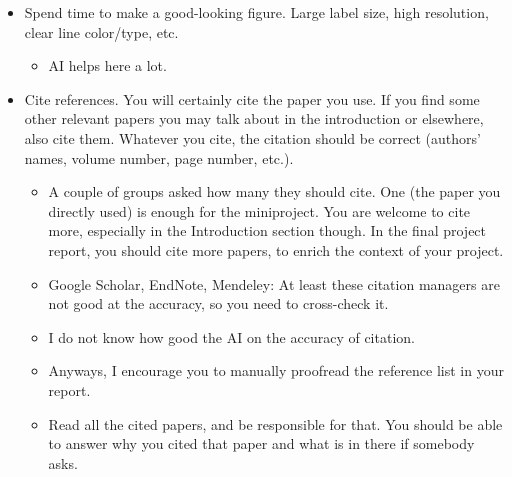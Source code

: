 \documentclass[20pt]{extarticle}
\begin{document}
\begin{enumerate}
\begin{itemize}
\begin{itemize}
		\end{itemize}
	\item Spend time to make a good-looking figure. Large label size, high resolution, clear line color/type, etc.
		\begin{itemize}
		\item AI helps here a lot.
		\end{itemize}
	\item Cite references. You will certainly cite the paper you use. If you find some other relevant papers you may talk about in the introduction or elsewhere, also cite them. Whatever you cite, the citation should be correct (authors' names, volume number, page number, etc.). 
		\begin{itemize}
		\item A couple of groups asked how many they should cite. One (the paper you directly used) is enough for the miniproject. You are welcome to cite more, especially in the Introduction section though. In the final project report, you should cite more papers, to enrich the context of your project.
		\item Google Scholar, EndNote, Mendeley: At least these citation managers are not good at the accuracy, so you need to cross-check it.
		\item I do not know how good the AI on the accuracy of citation.
		\item Anyways, I encourage you to manually proofread the reference list in your report.
		\item Read all the cited papers, and be responsible for that. You should be able to answer why you cited that paper and what is in there if somebody asks.
		\end{itemize}
	\end{itemize}	
\end{enumerate}
\end{document}
